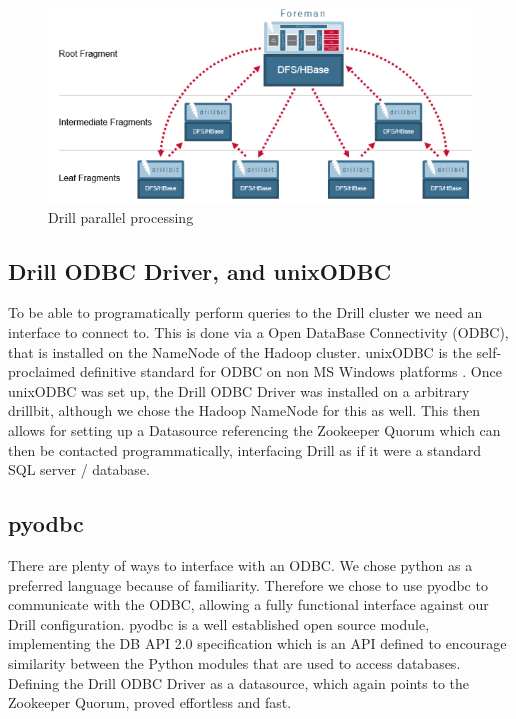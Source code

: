 \documentclass[a4paper,english]{report}
\begin{document}
		\begin{figure}[h]
			\includegraphics[width=\textwidth]{mapr_drill2}
			\caption{Drill parallel processing \cite{mapr_drill}}
		\end{figure}
		
		\subsection{Drill ODBC Driver, and unixODBC}
		To be able to programatically perform queries to the Drill cluster we need an interface to connect to. This is done via a Open DataBase Connectivity (ODBC), that is installed on the NameNode of the Hadoop cluster. unixODBC is the self-proclaimed definitive standard for ODBC on non MS Windows	platforms \cite{unixodbc}. Once unixODBC was set up, the Drill ODBC Driver was installed on a arbitrary drillbit, although we chose the Hadoop NameNode for this as well. This then allows for setting up a Datasource referencing the Zookeeper Quorum which can then be contacted programmatically, interfacing Drill as if it were a standard SQL server / database.
		
		\subsection{pyodbc}
		There are plenty of ways to interface with an ODBC. We chose python as a preferred language because of familiarity. Therefore we chose to use pyodbc \cite{pyodbc} to communicate with the ODBC, allowing a fully functional interface against our Drill configuration. pyodbc is a well established open source module, implementing the DB API 2.0 specification which is an API defined to encourage similarity between the Python modules that are used to access databases. Defining the Drill ODBC Driver as a datasource, which again points to the Zookeeper Quorum, proved effortless and fast.
\end{document}
